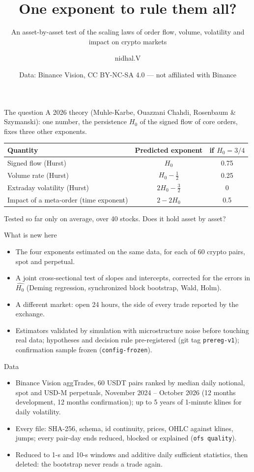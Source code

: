 \documentclass[aspectratio=169,11pt]{beamer}
\title{One exponent to rule them all?}
\subtitle{An asset-by-asset test of the scaling laws of order flow, volume, volatility and
impact on crypto markets}
\author{nidhal.V}
\date{Data: Binance Vision, CC BY-NC-SA 4.0 --- not affiliated with Binance}
\newcommand{\Hz}{H_0}
\begin{document}
\begin{frame}
  \titlepage
\end{frame}

\begin{frame}{The question}
  A 2026 theory (Muhle-Karbe, Ouazzani Chahdi, Rosenbaum \& Szymanski): one number,
  the persistence $\Hz$ of the signed flow of core orders, fixes three other exponents.
  \medskip
  \begin{center}
  \begin{tabular}{lcc}
    \toprule
    Quantity & Predicted exponent & if $\Hz=3/4$ \\
    \midrule
    Signed flow (Hurst) & $\Hz$ & 0.75 \\
    Volume rate (Hurst) & $\Hz-\tfrac12$ & 0.25 \\
    Extraday volatility (Hurst) & $2\Hz-\tfrac32$ & 0 \\
    Impact of a meta-order (time exponent) & $2-2\Hz$ & 0.5 \\
    \bottomrule
  \end{tabular}
  \end{center}
  \medskip
  Tested so far only \alert{on average}, over 40 stocks. Does it hold \alert{asset by asset}?
\end{frame}

\begin{frame}{What is new here}
  \begin{itemize}
    \item The four exponents estimated on the \alert{same data}, for each of 60 crypto pairs,
      spot and perpetual.
    \item A \alert{joint} cross-sectional test of slopes and intercepts, corrected for the
      errors in $\widehat{\Hz}$ (Deming regression, synchronized block bootstrap, Wald, Holm).
    \item A different market: open 24 hours, the side of every trade reported by the exchange.
    \item Estimators validated \alert{by simulation} with microstructure noise before touching
      real data; hypotheses and decision rule \alert{pre-registered} (git tag
      \texttt{prereg-v1}); confirmation sample frozen (\texttt{config-frozen}).
  \end{itemize}
\end{frame}

\begin{frame}{Data}
  \begin{itemize}
    \item Binance Vision aggTrades, 60 USDT pairs ranked by median daily notional, spot and
      USD-M perpetuals, November 2024 -- October 2026 (12 months development, 12 months
      confirmation); up to 5 years of 1-minute klines for daily volatility.
    \item Every file: SHA-256, schema, id continuity, prices, OHLC against klines, jumps;
      every pair-day ends reduced, blocked or explained (\texttt{ofs quality}).
    \item Reduced to 1-s and 10-s windows and additive daily sufficient statistics, then
      deleted: the bootstrap never reads a trade again.
  \end{itemize}
\end{frame}
\end{document}

